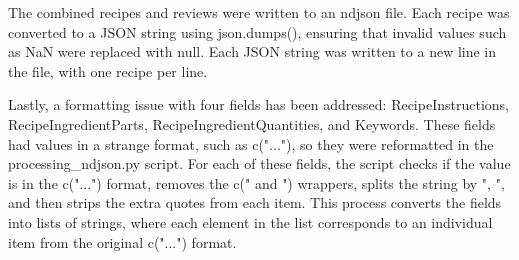 The combined recipes and reviews were written to an ndjson file. Each recipe was converted to a JSON string using json.dumps(), ensuring that invalid values such as NaN were replaced with null. Each JSON string was written to a new line in the file, with one recipe per line.

Lastly, a formatting issue with four fields has been addressed: RecipeInstructions, RecipeIngredientParts, RecipeIngredientQuantities, and Keywords. These fields had values in a strange format, such as c("..."), so they were reformatted in the processing\_ndjson.py script. For each of these fields, the script checks if the value is in the c("...") format, removes the c(" and ") wrappers, splits the string by ", ", and then strips the extra quotes from each item. This process converts the fields into lists of strings, where each element in the list corresponds to an individual item from the original c("...") format.
